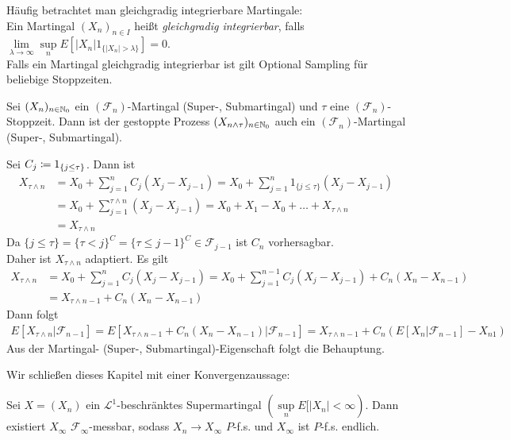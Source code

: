\documentclass[a4paper,twoside,DIV15,BCOR12mm]{scrbook}
\newcommand{\cF}{\mathcal F}
\begin{document}
\begin{bemerkung}
Häufig betrachtet man gleichgradig integrierbare Martingale:\\
Ein Martingal $(X_n)_{n\in I}$ heißt \textit{gleichgradig integrierbar}, falls $\lim\limits_{\lambda\to\infty}\sup\limits_n E[|X_n| 1_{\{|X_n|>\lambda\}}]=0$.\\
Falls ein Martingal gleichgradig integrierbar ist gilt Optional Sampling für beliebige Stoppzeiten.
\end{bemerkung}

\begin{satz}
Sei $(X_n)_{n\in\mathbb{N}_0}$ ein $(\cF_n)$-Martingal (Super-, Submartingal) und $\tau$ eine $(\cF_n)$-Stoppzeit. Dann ist der gestoppte Prozess $(X_{n\wedge\tau})_{n\in\mathbb{N}_0}$ auch ein $(\cF_n)$-Martingal (Super-, Submartingal).
\end{satz}
\begin{beweis}
Sei $C_j\da 1_{\{j\leq \tau\}}$. Dann ist
\begin{align*}
X_{\tau\wedge n}&=X_0+\sum\limits_{j=1}^n C_j (X_j-X_{j-1})=X_0+\sum\limits_{j=1}^n1_{\{j\leq\tau\}}(X_j-X_{j-1})\\
&=X_0+\sum\limits_{j=1}^{\tau\wedge n}(X_j-X_{j-1})=X_0+X_1-X_0+\ldots+X_{\tau\wedge n}\\
&= X_{\tau\wedge n}
\end{align*}
Da $\{j\leq\tau\}=\{\tau<j\}^C=\{\tau\leq j-1\}^C \in \cF_{j-1}$ ist $C_n$ vorhersagbar.\\
Daher ist $X_{\tau\wedge n}$ adaptiert. Es gilt
\begin{align*}
X_{\tau\wedge n}&=X_0+\sum\limits_{j=1}^n C_j (X_j-X_{j-1})=X_0+\sum\limits_{j=1}^{n-1}C_j(X_j-X_{j-1})+C_n(X_n-X_{n-1})\\
&= X_{\tau\wedge n-1}+C_n(X_n-X_{n-1})
\end{align*}
Dann folgt 
\begin{align*}
E[X_{\tau\wedge n}|\cF_{n-1}]=E[X_{\tau\wedge n-1}+C_n(X_n-X_{n-1})|\cF_{n-1}]=X_{\tau\wedge n-1}+C_n(E[X_n|\cF_{n-1}]-X_{n1})
\end{align*}
Aus der Martingal- (Super-, Submartingal)-Eigenschaft folgt die Behauptung.
\end{beweis}
Wir schließen dieses Kapitel mit einer Konvergenzaussage:
\begin{satz}Sei $X=(X_n)$ ein $\mathcal{L}^1$-beschränktes Supermartingal $(\sup\limits_n E[|X_n|<\infty)$. Dann existiert $X_\infty$ $\cF_\infty$-messbar, sodass $X_n\to X_\infty$ $P$-f.s. und $X_\infty$ ist $P$-f.s. endlich.
\end{satz}
\end{document}
